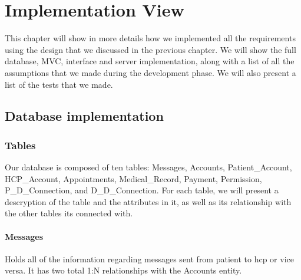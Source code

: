 \documentclass[12pt]{report}
\begin{document}
\chapter{Implementation View}
This chapter will show in more details how we implemented all the requirements using the design that we discussed in the previous chapter. We will show the full database, MVC, interface and server implementation, along with a list of all the assumptions that we made during the development phase. We will also present a list of the tests that we made.

\section{Database implementation}
\subsection{Tables}
Our database is composed of ten tables: Messages, Accounts, Patient\_Account, HCP\_Account, Appointments, Medical\_Record, Payment, Permission, P\_D\_Connection, and D\_D\_Connection.  For each table, we will present a descryption of the table and the attributes in it, as well as its relationship with the other tables its connected with.

\subsubsection{Messages}
Holds all of the information regarding messages sent from patient to hcp or vice versa. It has two total 1:N relationships with the Accounts entity.
\end{document}
